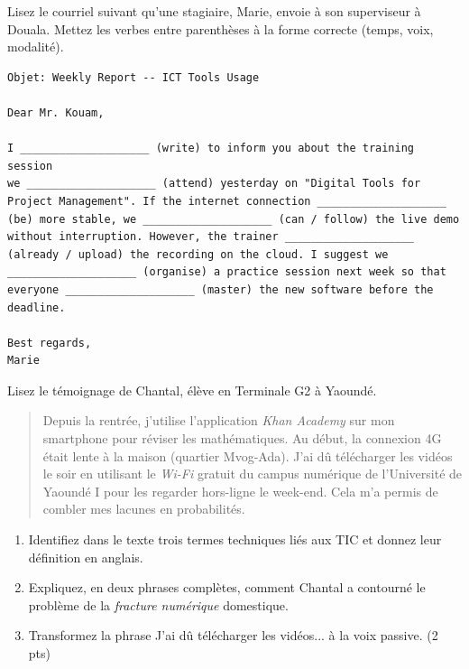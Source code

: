 \documentclass[11pt]{article}
\begin{document}
\begin{exercice}
Lisez le courriel suivant qu'une stagiaire, Marie, envoie à son superviseur à Douala. Mettez les verbes entre parenthèses à la forme correcte (temps, voix, modalité).

\begin{verbatim}
Objet: Weekly Report -- ICT Tools Usage

Dear Mr. Kouam,

I ____________________ (write) to inform you about the training session
we ____________________ (attend) yesterday on "Digital Tools for
Project Management". If the internet connection ____________________
(be) more stable, we ____________________ (can / follow) the live demo
without interruption. However, the trainer ____________________
(already / upload) the recording on the cloud. I suggest we
____________________ (organise) a practice session next week so that
everyone ____________________ (master) the new software before the
deadline.

Best regards,
Marie
\end{verbatim}
\end{exercice}

\begin{exercice}
Lisez le témoignage de Chantal, élève en Terminale G2 à Yaoundé.

\begin{quote}
\og Depuis la rentrée, j'utilise l'application \textit{Khan Academy} sur mon smartphone pour réviser les mathématiques. Au début, la connexion 4G était lente à la maison (quartier Mvog-Ada). J'ai dû télécharger les vidéos le soir en utilisant le \textit{Wi-Fi} gratuit du campus numérique de l'Université de Yaoundé I pour les regarder hors-ligne le week-end. Cela m'a permis de combler mes lacunes en probabilités. \fg
\end{quote}

\begin{enumerate}
    \item Identifiez dans le texte trois termes techniques liés aux TIC et donnez leur définition en anglais.
    \item Expliquez, en deux phrases complètes, comment Chantal a contourné le problème de la \textit{fracture numérique} domestique.
    \item Transformez la phrase \og J'ai dû télécharger les vidéos... \fg à la voix passive. \hfill (2 pts)
\end{enumerate}
\end{exercice}
\end{document}
